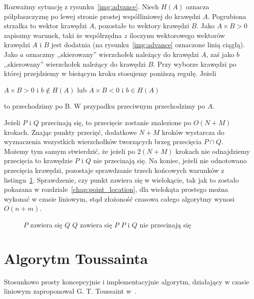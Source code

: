 Rozważmy sytuację z rysunku~\ref{img:advance}. Niech $H(A)$ oznacza
półpłaszczyznę po lewej stronie prostej współliniowej do krawędzi
$A$. Pogrubiona strzałka to wektor krawędzi $A$, pozostałe to wektory
krawędzi $B$.  Jako $A \times B > 0$ zapiszmy warunek, taki że
współrzędna $z$ iloczynu wektorowego wektorów krawędzi $A$ i $B$ jest
dodatnia (na rysunku~\ref{img:advance} oznaczone linią ciągłą). Jako
$a$ oznaczmy ,,skierowany'' wierzchołek należący do krawędzi $A$, zaś
jako $b$ ,,skierowany'' wierzchołek należący do krawędzi $B$. Przy
wyborze krawędzi po której przejdziemy w bieżącym kroku stosujemy
poniższą regułę. Jeżeli

\begin{center}
$A \times B > 0 $ i $b \notin H(A)$ lub $A \times B < 0 $ i $b \in H(A)$
\end{center}

to przechodzimy po B. W przypadku przeciwnym przechodzimy po $A$.

Jeżeli $P$ i $Q$ przecinają się, to przecięcie zostanie znalezione po
$O(N+M)$ krokach. Znając punkty przecięć, dodatkowe $N+M$ kroków
wystarcza do wyznaczenia wszystkich wierzchołków tworzących brzeg
przecięcia $P \cap Q$. Możemy tym samym stwierdzić, że jeżeli po
$2(N+M)$ krokach nie odnajdziemy przecięcia to krawędzie $P$ i $Q$ nie
przecinają się. Na koniec, jeżeli nie odnotowano przecięcia krawędzi,
pozostaje sprawdzanie trzech końcowych warunków z
listingu~\ref{alg:OrourkeFinalTerms}. Sprawdzenie, czy punkt zawiera
się w wielokącie, tak jak to zostało pokazana w
rozdziale~\ref{chap:point_location}, dla wielokąta prostego można
wykonać w czasie liniowym, stąd złożoność czasowa całego algorytmy
wynosi $O(n + m)$.

\begin{figure}
  \begin{algorithmic}[1]
        \State $P$ zawiera się $Q$
    \Else
                \State $Q$ zawiera się $P$
        \Else
                \State $P$ i $Q$ nie przecinają się
        \EndIf
    \EndIf
  \end{algorithmic}
  \caption{\label{alg:OrourkeFinalTerms}}
\end{figure}

\section{Algorytm Toussainta}
Stosunkowo prosty koncepcyjnie i implementacyjnie algorytm, działający
w czasie liniowym zaproponował G. T. Toussaint w~\cite{ToussaintInt}.

